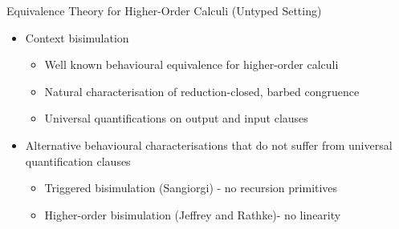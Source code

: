 \documentclass{beamer}
\begin{document}
	\begin{frame}{Equivalence Theory for Higher-Order Calculi (Untyped Setting)}
		\begin{itemize}
			\item	Context bisimulation
				\begin{itemize}
					\item	Well known behavioural equivalence for higher-order calculi
					\item	Natural characterisation of reduction-closed, barbed congruence
					\item	Universal quantifications on output and input clauses
				\end{itemize}


			\item	Alternative behavioural characterisations that do not suffer from universal quantification clauses
				\begin{itemize}
					\item	Triggered bisimulation (Sangiorgi) - no recursion primitives
					\item	Higher-order bisimulation (Jeffrey and Rathke)- no linearity
				\end{itemize}
		\end{itemize}
	\end{frame}
\end{document}
